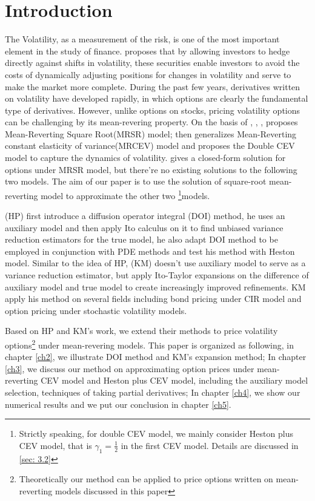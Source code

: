 \chapter{Introduction}

The Volatility, as a measurement of the risk, is one of the most important element in the study of finance. \cite{whaley_derivatives_1993} proposes that by allowing investors to hedge directly against shifts in volatility, these securities enable investors to avoid the costs of dynamically adjusting positions for changes in volatility and serve to make the market more complete. During the past few years, derivatives written on volatility have developed rapidly, in which options are clearly the fundamental type of derivatives. However, unlike options on stocks, pricing volatility options can be challenging by its mean-revering property. On the basis of \cite{cox_theory_1985}, \cite{hull_pricing_1987}, \cite{heston_closed-form_1993}, \cite{grunbichler_valuing_1996} proposes Mean-Reverting Square Root(MRSR) model; \cite{chan_empirical_1992} then generalizes Mean-Reverting constant elasticity of variance(MRCEV) model and \cite{gatheral_consistent_2008} proposes the Double CEV model to capture the dynamics of volatility. \cite{grunbichler_valuing_1996} gives a closed-form solution for options under MRSR model, but there're no existing solutions to the following two models. The aim of our paper is to use the solution of square-root mean-reverting model to approximate the other two \footnote{Strictly speaking, for double CEV model, we mainly consider Heston plus CEV model, that is $\gamma_1=\frac{1}{2}$ in the first CEV model. Details are discussed in \ref{sec: 3.2}}{models}.

\cite{heath_variance_2002}(HP) first introduce a diffusion operator integral (DOI) method, he uses an auxiliary model and then apply Ito calculus on it to find unbiased variance reduction estimators for the true model, he also adapt DOI method to be employed in conjunction with PDE methods and test his method with Heston model. Similar to the idea of HP, \cite{kristensen_adding_2011}(KM) doesn't use auxiliary model to serve as a variance reduction estimator, but apply Ito-Taylor expansions on the difference of auxiliary model and true model to  create increasingly improved refinements. KM apply his method on several fields including bond pricing under CIR model and option pricing under stochastic volatility models.

Based on HP and KM's work, we extend their methods to price volatility options\footnote{Theoretically our method can be applied to price options written on mean-reverting models discussed in this paper} under mean-revering models. This paper is organized as following, in chapter \ref{ch2}, we illustrate DOI method and KM's expansion method; In chapter \ref{ch3}, we discuss our method on approximating option prices under mean-reverting CEV model and Heston plus CEV model, including the auxiliary model selection, techniques of taking partial derivatives; In chapter \ref{ch4}, we show our numerical results and we put our conclusion in chapter \ref{ch5}.